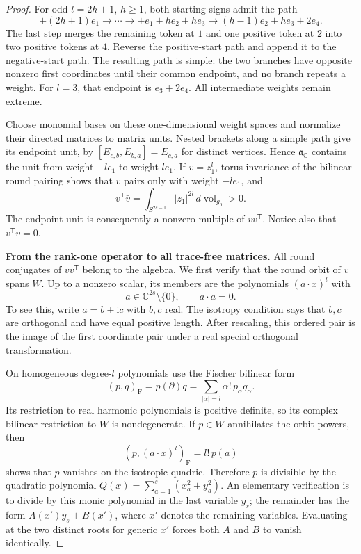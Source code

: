 \begin{proof}
For odd \(l=2h+1\), \(h\geq1\), both starting signs admit the path
\[
 \pm(2h+1)e_1\longrightarrow\cdots
 \longrightarrow\pm e_1+he_2+he_3
 \longrightarrow(h-1)e_2+he_3+2e_4.
\]
The last step merges the remaining token at \(1\) and one positive
token at \(2\) into two positive tokens at \(4\).  Reverse the
positive-start path and append it to the negative-start path.
The resulting path is simple: the two branches have opposite
nonzero first coordinates until their common endpoint, and no
branch repeats a weight.  For \(l=3\), that endpoint is \(e_3+2e_4\).
All intermediate weights remain extreme.

Choose monomial bases on these one-dimensional weight spaces and
normalize their directed matrices to matrix units.  Nested brackets
along a simple path give its endpoint unit, by
\([E_{c,b},E_{b,a}]=E_{c,a}\) for distinct vertices.  Hence
\(\mathfrak a_{\mathbb C}\) contains the unit from weight \(-le_1\)
to weight \(le_1\).  If \(v=z_1^l\), torus invariance of the bilinear
round pairing shows that \(v\) pairs only with weight \(-le_1\), and
\[
 v^{\mathsf T}\bar v
   =\int_{S^{2s-1}}|z_1|^{2l}\,d\operatorname{vol}_{g_0}>0.
\]
The endpoint unit is consequently a nonzero multiple of
\(vv^{\mathsf T}\).  Notice also that \(v^{\mathsf T}v=0\).

\medskip
\noindent\textbf{From the rank-one operator to all trace-free matrices.}
All round conjugates of \(vv^{\mathsf T}\) belong to the algebra.
We first verify that the round orbit of \(v\) spans \(W\).
Up to a nonzero scalar, its members are the polynomials
\((a\cdot x)^l\) with
\[
 a\in\mathbb C^{2s}\setminus\{0\},\qquad a\cdot a=0.
\]
To see this, write \(a=b+\mathrm i c\) with \(b,c\) real.  The
isotropy condition says that \(b,c\) are orthogonal and have equal
positive length.  After rescaling, this ordered pair is the image
of the first coordinate pair under a real special orthogonal
transformation.

On homogeneous degree-\(l\) polynomials use the Fischer bilinear
form
\[
 (p,q)_{\mathrm F}=p(\partial)q
       =\sum_{|\alpha|=l}\alpha!\,p_\alpha q_\alpha.
\]
Its restriction to real harmonic polynomials is positive definite,
so its complex bilinear restriction to \(W\) is nondegenerate.
If \(p\in W\) annihilates the orbit powers, then
\[
 (p,(a\cdot x)^l)_{\mathrm F}=l!\,p(a)
\]
shows that \(p\) vanishes on the isotropic quadric.  Therefore
\(p\) is divisible by the quadratic polynomial
\(Q(x)=\sum_{a=1}^s(x_a^2+y_a^2)\).  An elementary verification
is to divide by this monic polynomial in the last variable \(y_s\);
the remainder has the form \(A(x')y_s+B(x')\), where \(x'\) denotes
the remaining variables.  Evaluating at the two
distinct roots for generic \(x'\) forces both \(A\) and \(B\) to
vanish identically.


\end{proof}
